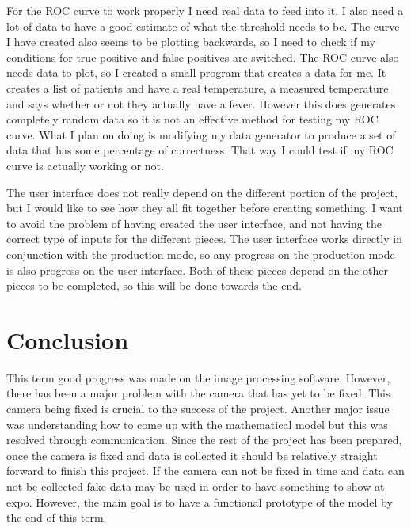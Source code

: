 \documentclass[onecolumn, draftclsnofoot,10pt, compsoc]{IEEEtran}
\begin{document}
For the ROC curve to work properly I need real data to feed into it. I also need a lot of data to have a good estimate of what the threshold needs to be. The curve I have created also seems to be plotting backwards, so I need to check if my conditions for true positive and false positives are switched. The ROC curve also needs data to plot, so I created a small program that creates a data for me. It creates a list of patients and have a real temperature, a measured temperature and says whether or not they actually have a fever. However this does generates completely random data so it is not an effective method for testing my ROC curve. What I plan on doing is modifying my data generator to produce a set of data that has some percentage of correctness. That way I could test if my ROC curve is actually working or not.

The user interface does not really depend on the different portion of the project, but I would like to see how they all fit together before creating something. I want to avoid the problem of having created the user interface, and not having the correct type of inputs for the different pieces. The user interface works directly in conjunction with the production mode, so any progress on the production mode is also progress on the user interface. Both of these pieces depend on the other pieces to be completed, so this will be done towards the end.


\section{Conclusion}

This term good progress was made on the image processing software. However, there has been a major problem with the camera that has yet to be fixed. This camera being fixed is crucial to the success of the project. Another major issue was understanding how to come up with the mathematical model but this was resolved through communication. Since the rest of the project has been prepared, once the camera is fixed and data is collected it should be relatively straight forward to finish this project. If the camera can not be fixed in time and data can not be collected fake data may be used in order to have something to show at expo. However, the main goal is to have a functional prototype of the model by the end of this term.





\end{document}

